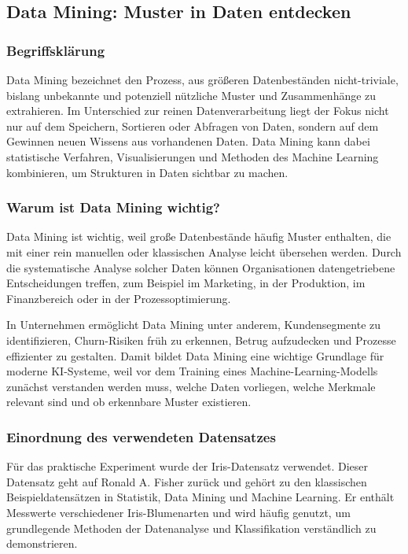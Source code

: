 \documentclass[12pt,a4paper]{article}
\begin{document}
\subsection{Data Mining: Muster in Daten entdecken}

\subsubsection*{Begriffsklärung}

Data Mining bezeichnet den Prozess, aus größeren Datenbeständen nicht-triviale, bislang unbekannte und potenziell nützliche Muster und Zusammenhänge zu extrahieren.\cite{witten_data_mining,fayyad_kdd} Im Unterschied zur reinen Datenverarbeitung liegt der Fokus nicht nur auf dem Speichern, Sortieren oder Abfragen von Daten, sondern auf dem Gewinnen neuen Wissens aus vorhandenen Daten.\cite{witten_data_mining} Data Mining kann dabei statistische Verfahren, Visualisierungen und Methoden des Machine Learning kombinieren, um Strukturen in Daten sichtbar zu machen.\cite{han_data_mining}

\subsubsection*{Warum ist Data Mining wichtig?}

Data Mining ist wichtig, weil große Datenbestände häufig Muster enthalten, die mit einer rein manuellen oder klassischen Analyse leicht übersehen werden.\cite{ibm_data_mining,haufe_data_mining} Durch die systematische Analyse solcher Daten können Organisationen datengetriebene Entscheidungen treffen, zum Beispiel im Marketing, in der Produktion, im Finanzbereich oder in der Prozessoptimierung.\cite{inform_data_mining}

In Unternehmen ermöglicht Data Mining unter anderem, Kundensegmente zu identifizieren, Churn-Risiken früh zu erkennen, Betrug aufzudecken und Prozesse effizienter zu gestalten.\cite{haufe_data_mining,ibm_data_mining} Damit bildet Data Mining eine wichtige Grundlage für moderne KI-Systeme, weil vor dem Training eines Machine-Learning-Modells zunächst verstanden werden muss, welche Daten vorliegen, welche Merkmale relevant sind und ob erkennbare Muster existieren.

\subsubsection*{Einordnung des verwendeten Datensatzes}

Für das praktische Experiment wurde der Iris-Datensatz verwendet. Dieser Datensatz geht auf Ronald A. Fisher zurück und gehört zu den klassischen Beispieldatensätzen in Statistik, Data Mining und Machine Learning.\cite{fisher_iris} Er enthält Messwerte verschiedener Iris-Blumenarten und wird häufig genutzt, um grundlegende Methoden der Datenanalyse und Klassifikation verständlich zu demonstrieren.\cite{sklearn_iris}
\end{document}
